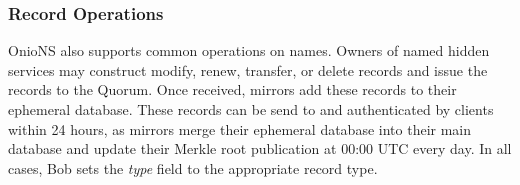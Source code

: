 \documentclass[USenglish,oneside,twocolumn]{article}
\begin{document}
%
%





\subsubsection{Record Operations}
\label{sec:recordOps}


OnioNS also supports common operations on names. Owners of named hidden services may construct modify, renew, transfer, or delete records and issue the records to the Quorum. Once received, mirrors add these records to their ephemeral database. These records can be send to and authenticated by clients within 24 hours, as mirrors merge their ephemeral database into their main database and update their Merkle root publication at 00:00 UTC every day. In all cases, Bob sets the \emph{type} field to the appropriate record type.
\end{document}
